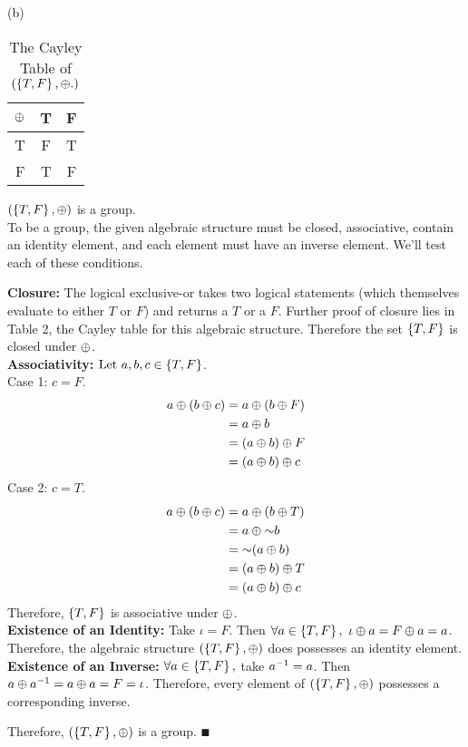 \documentclass[a4paper, 11pt]{report}
\begin{document}
\sol (b) \\
\begin{table}[h]
  \begin{center}
    \begin{tabular}{c|cc}
      $\oplus$ & T & F \\ \hline
      T       & F & T \\
      F       & T & F \\   
    \end{tabular}
    \caption{The Cayley Table of $(\left\lbrace T,F \right\rbrace,\oplus.)$} 
  \end{center}
\end{table}

\Claim $(\left\lbrace T,F \right\rbrace,\oplus)$ is a group. \\
\proof To be a group, the given algebraic structure must be closed, associative, contain an identity element, and each element must have an inverse element. We'll test each of these conditions. \\ 
\begin{list}{}{\setlength{\leftmargin}{0.5in}\setlength{\topsep}{0pt}}\item 
  \textbf{Closure:} The logical exclusive-or takes two logical statements (which themselves evaluate to either $T$ or $F$) and returns a $T$ or a $F$. Further proof of closure lies in Table 2, the Cayley table for this algebraic structure. Therefore the set $\left\lbrace T,F \right\rbrace$ is closed under $\oplus$. \\
  \textbf{Associativity:} $\text{Let } a,b,c\in\left\lbrace T,F \right\rbrace$. \\
  Case 1: $c=F$. \vspace{-11pt}
  \begin{align*}
    a\oplus(b\oplus c) &= a\oplus(b\oplus F) \\
      &= a\oplus b \\
      &= (a\oplus b)\oplus F \\
      &= (a\oplus b)\oplus c
  \end{align*}
  Case 2: $c=T$. \vspace*{-11pt}
  \begin{align*}
    a\oplus(b\oplus c) &= a\oplus(b\oplus T) \\
      &= a\oplus\mathord{\sim} b \\
      &= \mathord{\sim}(a\oplus b) \\
      &= (a\oplus b)\oplus T \\
      &= (a\oplus b)\oplus c
  \end{align*}
  Therefore, $\left\lbrace T,F \right\rbrace$ is associative under $\oplus$. \\
  \textbf{Existence of an Identity:} Take $\iota = F$. Then $\forall a\in\left\lbrace T,F \right\rbrace,\ \iota\oplus a = F\oplus a = a$. Therefore, the algebraic structure $(\left\lbrace T,F \right\rbrace,\oplus)$ does possesses an identity element. \\
  \textbf{Existence of an Inverse:} $\forall a\in\left\lbrace T,F \right\rbrace,$ take $a^{-1}=a$. Then $a\oplus a^{-1} = a\oplus a = F = \iota$. Therefore, every element of $(\left\lbrace T,F \right\rbrace,\oplus)$ possesses a corresponding inverse. \\
\end{list}
Therefore, $(\left\lbrace T,F \right\rbrace, \oplus)$ is a group. $\QED$ \\
\end{document}
